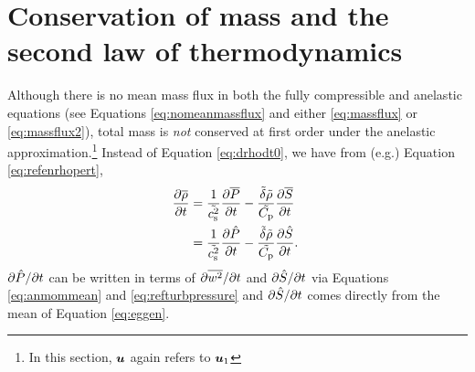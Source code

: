 \documentclass[12pt]{article}
\newcommand{\uone}{{\vecu}_1}
\begin{document}
\section{Conservation of mass and the second law of thermodynamics}\label{sec:secondlaw}
Although there is no mean mass flux in both the fully compressible and anelastic equations (see Equations \eqref{eq:nomeanmassflux} and either \eqref{eq:massflux} or \eqref{eq:massflux2}), total mass is \textit{not} conserved at first order under the anelastic approximation.\footnote{In this section, $\bm{u}$ again refers to $\uone$} Instead of Equation \eqref{eq:drhodt0}, we have from (e.g.) Equation \eqref{eq:refenrhopert}, 
\begin{align}\label{eq:drhodtnot0}
 \frac{\partial\overline{\rho}}{\partial t} &= \frac{1}{\tilde{c_{\rm s}^2}}\frac{\partial\overline{P}}{\partial t}-\frac{\tilde{\delta} \tilde{\rho}}{\tilde{C_{\rm{p}}}}\frac{\partial\overline{S}}{\partial t}\nonumber\\
 &=  \frac{1}{\tilde{c_{\rm s}^2}}\frac{\partial\hat{P}}{\partial t}-\frac{\tilde{\delta} \tilde{\rho}}{\tilde{C_{\rm{p}}}}\frac{\partial\hat{S}}{\partial t}.\
\end{align}
$\partial\hat{P}/\partial t$ can be written in terms of $\partial\overline{w^2}/\partial t$ and $\partial\hat{S}/\partial t$ via Equations \eqref{eq:anmommean} and \eqref{eq:refturbpressure} and $\partial\hat{S}/\partial t$ comes directly from the mean of Equation \eqref{eq:eggen}. 

\end{document}
